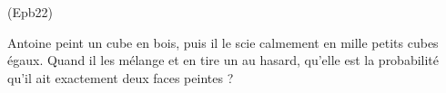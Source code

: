\begin{tiny}(Epb22)\end{tiny} Antoine peint un cube en bois, puis il le scie calmement en mille petits cubes égaux. Quand il les mélange et en tire un au hasard, qu'elle est la probabilité qu'il ait exactement deux faces peintes ? 